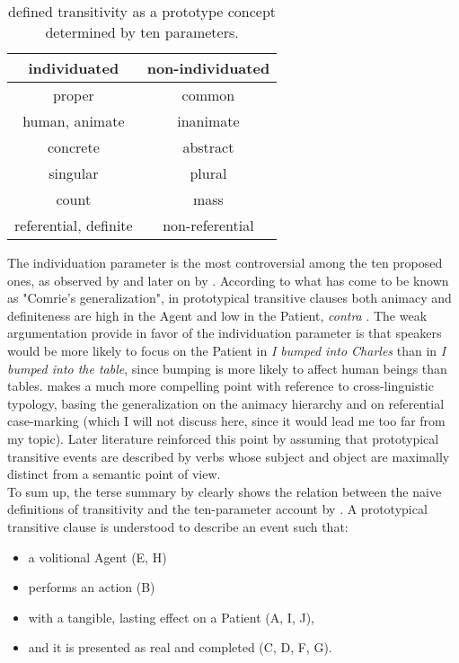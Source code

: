 \begin{table}[htb] %
\caption{\textcite[252]{HopperThompson1980} defined transitivity as a prototype concept determined by ten parameters.}
\begin{tabular}{c|c}
 \textbf{individuated} & \textbf{non-individuated} \\
 \hline
proper & common \\
human, animate & inanimate \\
concrete & abstract \\
singular & plural \\
count & mass \\
referential, definite & non-referential
\end{tabular}
\end{table}

The individuation parameter is the most controversial among the ten proposed ones, as observed by \textcite[128]{comrie1989language} and later on by \textcite[18]{Naess2007}. According to what has come to be known as "Comrie's generalization", in prototypical transitive clauses both animacy and definiteness are high in the Agent and low in the Patient, \textit{contra} \textcite{HopperThompson1980}. The weak argumentation \textcite{HopperThompson1980} provide in favor of the individuation parameter is that speakers would be more likely to focus on the Patient in \textit{I bumped into Charles} than in \textit{I bumped into the table}, since bumping is more likely to affect human beings than tables. \textcite{comrie1989language} makes a much more compelling point with reference to cross-linguistic typology, basing the generalization on the animacy hierarchy and on referential case-marking (which I will not discuss here, since it would lead me too far from my topic). Later literature \parencite{Naess2007, kemmer1993middle, Kardos2010, Naess2009} reinforced this point by assuming that prototypical transitive events are described by verbs whose subject and object are maximally distinct from a semantic point of view.\\
To sum up, the terse summary by \textcite[15]{Naess2007} clearly shows the relation between the naive definitions of transitivity and the ten-parameter account by \textcite{HopperThompson1980}. A prototypical transitive clause is understood to describe an event such that:
\begin{itemize}
    \item a volitional Agent (E, H)
    \item performs an action (B)
    \item with a tangible, lasting effect on a Patient (A, I, J),
    \item and it is presented as real and completed (C, D, F, G).
\end{itemize}


